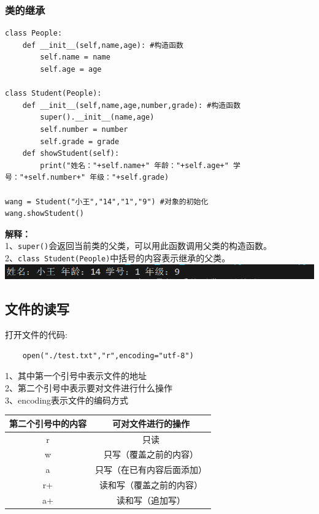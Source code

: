 \documentclass[UTF8,a4paper]{ctexart}
\begin{document}
\subsubsection{类的继承}
\begin{lstlisting}
class People:
    def __init__(self,name,age): #构造函数
        self.name = name
        self.age = age

class Student(People):
    def __init__(self,name,age,number,grade): #构造函数
        super().__init__(name,age) 
        self.number = number
        self.grade = grade
    def showStudent(self):
        print("姓名："+self.name+" 年龄："+self.age+" 学号："+self.number+" 年级："+self.grade)

wang = Student("小王","14","1","9") #对象的初始化
wang.showStudent()
    \end{lstlisting}
\textbf{解释：}\\
1、\verb|super()|会返回当前类的父类，可以用此函数调用父类的构造函数。\\
2、\verb|class Student(People)|中括号的内容表示继承的父类。\\
\includegraphics[width=1\textwidth]{./python/inherit.png}

\subsection{文件的读写}
打开文件的代码:
\begin{lstlisting}
    open("./test.txt","r",encoding="utf-8")
\end{lstlisting}
1、其中第一个引号中表示文件的地址\\
2、第二个引号中表示要对文件进行什么操作\\
3、encoding表示文件的编码方式\\
\begin{table}[H]
    \centering
    \begin{tabular}{c|c}
    第二个引号中的内容 & 可对文件进行的操作\\
    \hline
    r & 只读\\
    w & 只写（覆盖之前的内容）\\
    a & 只写（在已有内容后面添加）\\
    r+ & 读和写（覆盖之前的内容）\\
    a+ & 读和写（追加写）\\
    \hline
\end{tabular}
\end{table}
\end{document}

